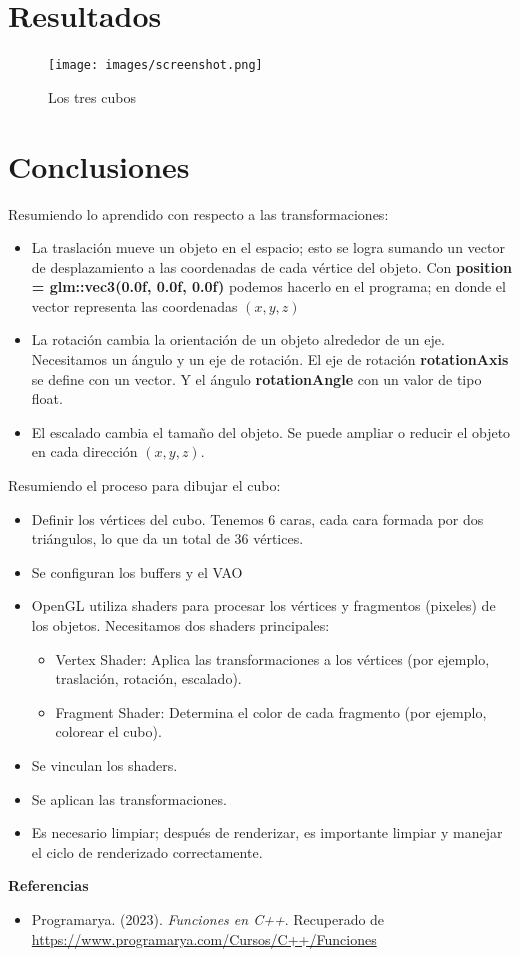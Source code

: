 \documentclass[a4paper,11pt]{article}                 %
\begin{document}
\section{Resultados}
\begin{figure}[H]
    \centering
    \texttt{[image: images/screenshot.png]}
    \caption{Los tres cubos}
    \label{fig:imagen1}
\end{figure}

\section{Conclusiones}
Resumiendo lo aprendido con respecto a las transformaciones:
\begin{itemize}
    \item La traslación mueve un objeto en el espacio; esto se logra sumando un vector de desplazamiento a las coordenadas de cada vértice del objeto. Con \textbf{position = glm::vec3(0.0f, 0.0f, 0.0f)} podemos hacerlo en el programa; en donde el vector representa las coordenadas $(x,y,z)$
    \item La rotación cambia la orientación de un objeto alrededor de un eje. Necesitamos un ángulo y un eje de rotación. El eje de rotación \textbf{rotationAxis} se define con un vector. Y el ángulo \textbf{rotationAngle} con un valor de tipo float.
    \item El escalado cambia el tamaño del objeto. Se puede ampliar o reducir el objeto en cada dirección $(x, y, z)$.
\end{itemize}
Resumiendo el proceso para dibujar el cubo:
\begin{itemize}
    \item Definir los vértices del cubo. Tenemos 6 caras, cada cara formada por dos triángulos, lo que da un total de 36 vértices.
    \item Se configuran los buffers y el VAO
    \item OpenGL utiliza shaders para procesar los vértices y fragmentos (pixeles) de los objetos. Necesitamos dos shaders principales:
    \begin{itemize}
        \item Vertex Shader: Aplica las transformaciones a los vértices (por ejemplo, traslación, rotación, escalado).
        \item Fragment Shader: Determina el color de cada fragmento (por ejemplo, colorear el cubo).
    \end{itemize}
    \item Se vinculan los shaders.
    \item Se aplican las transformaciones.
    \item Es necesario limpiar; después de renderizar, es importante limpiar y manejar el ciclo de renderizado correctamente.
\end{itemize}


\vspace{1cm}
\noindent\textbf{Referencias}
\begin{itemize}
    \item Programarya. (2023). \textit{Funciones en C++}. Recuperado de \url{https://www.programarya.com/Cursos/C++/Funciones}
\end{itemize}
\end{document}
